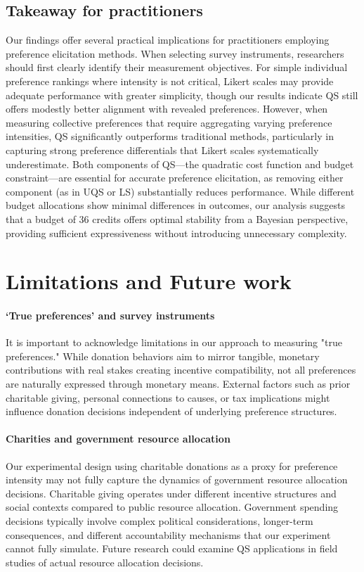 \subsection{Takeaway for practitioners}
Our findings offer several practical implications for practitioners employing preference elicitation methods. When selecting survey instruments, researchers should first clearly identify their measurement objectives. For simple individual preference rankings where intensity is not critical, Likert scales may provide adequate performance with greater simplicity, though our results indicate QS still offers modestly better alignment with revealed preferences. However, when measuring collective preferences that require aggregating varying preference intensities, QS significantly outperforms traditional methods, particularly in capturing strong preference differentials that Likert scales systematically underestimate. Both components of QS—the quadratic cost function and budget constraint—are essential for accurate preference elicitation, as removing either component (as in UQS or LS) substantially reduces performance. While different budget allocations show minimal differences in outcomes, our analysis suggests that a budget of 36 credits offers optimal stability from a Bayesian perspective, providing sufficient expressiveness without introducing unnecessary complexity.

\section{Limitations and Future work}
\label{sec:limitations}

\paragraph{`True preferences' and survey instruments}
It is important to acknowledge limitations in our approach to measuring "true preferences." While donation behaviors aim to mirror tangible, monetary contributions with real stakes creating incentive compatibility, not all preferences are naturally expressed through monetary means. External factors such as prior charitable giving, personal connections to causes, or tax implications might influence donation decisions independent of underlying preference structures.

\paragraph{Charities and government resource allocation}
Our experimental design using charitable donations as a proxy for preference intensity may not fully capture the dynamics of government resource allocation decisions. Charitable giving operates under different incentive structures and social contexts compared to public resource allocation. Government spending decisions typically involve complex political considerations, longer-term consequences, and different accountability mechanisms that our experiment cannot fully simulate. Future research could examine QS applications in field studies of actual resource allocation decisions.

